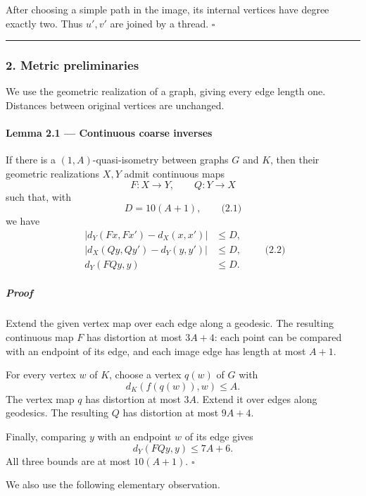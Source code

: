 \documentclass[
  11pt,
  a4paper,
]{article}
\begin{document}
After choosing a simple path in the image, its internal vertices have
degree exactly two. Thus \(u',v'\) are joined by a thread. \(\square\)

\begin{center}\rule{0.5\linewidth}{0.5pt}\end{center}

\subsubsection{2. Metric preliminaries}\label{metric-preliminaries}

We use the geometric realization of a graph, giving every edge length
one. Distances between original vertices are unchanged.

\paragraph{Lemma 2.1 --- Continuous coarse
inverses}\label{lemma-2.1-continuous-coarse-inverses}

If there is a \((1,A)\)-quasi-isometry between graphs \(G\) and \(K\),
then their geometric realizations \(X,Y\) admit continuous maps \[
F:X\to Y,\qquad Q:Y\to X
\] such that, with \[
D=10(A+1),
\qquad\text{(2.1)}
\] we have \begin{equation*}
\begin{aligned}
|d_Y(Fx,Fx')-d_X(x,x')|&\le D,\\
|d_X(Qy,Qy')-d_Y(y,y')|&\le D,\\
d_Y(FQy,y)&\le D.
\end{aligned}
\qquad\text{(2.2)}
\end{equation*}

\subparagraph{Proof}\label{proof-1}

Extend the given vertex map over each edge along a geodesic. The
resulting continuous map \(F\) has distortion at most \(3A+4\): each
point can be compared with an endpoint of its edge, and each image edge
has length at most \(A+1\).

For every vertex \(w\) of \(K\), choose a vertex \(q(w)\) of \(G\) with
\[
d_K(f(q(w)),w)\le A.
\] The vertex map \(q\) has distortion at most \(3A\). Extend it over
edges along geodesics. The resulting \(Q\) has distortion at most
\(9A+4\).

Finally, comparing \(y\) with an endpoint \(w\) of its edge gives \[
d_Y(FQy,y)\le 7A+6.
\] All three bounds are at most \(10(A+1)\). \(\square\)

We also use the following elementary observation.
\end{document}
